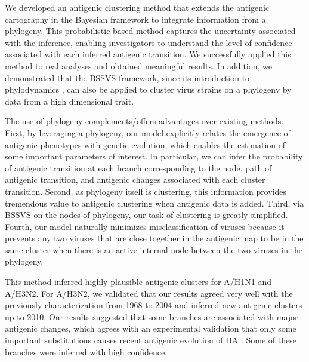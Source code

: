 \documentclass[11pt,oneside,letterpaper]{article}
\begin{document}
We developed an antigenic clustering method that extends the antigenic cartography in the Bayesian framework to integrate information from a phylogeny. 
This probabilistic-based method captures the uncertainty associated with the inference, enabling investigators to understand the level of confidence associated with each inferred antigenic transition. 
We successfully applied this method to real analyses and obtained meaningful results.
In addition, we demonstrated that the BSSVS framework, since its introduction to phylodynamics \cite{lemey_bayesian_2009, drummond_bayesian_2010}, can also be applied to cluster virus strains on a phylogeny by data from a high dimensional trait.  %

The use of phylogeny complements/offers advantages over existing methods. 
First, by leveraging a phylogeny, our model explicitly relates the emergence of antigenic phenotypes with genetic evolution, which enables the estimation of some important parameters of interest. 
In particular, we can infer the probability of antigenic transition at each branch corresponding to the node, path of antigenic transition, and antigenic changes associated with each cluster transition. 
Second, as phylogeny itself is clustering, this information provides tremendous value to antigenic clustering when antigenic data is added. 
Third, via BSSVS on the nodes of phylogeny, our task of clustering is greatly simplified. 
Fourth, our model naturally minimizes misclassification of viruses because it prevents any two viruses that are close together in the antigenic map to be in the same cluster when there is an active internal node between the two viruses in the phylogeny.

This method inferred highly plausible antigenic clusters for A/H1N1 and A/H3N2. 
For  A/H3N2, we validated that our results agreed very well with the previously characterization from 1968 to 2004 \cite{smith_mapping_2004} and inferred new antigenic clusters up to 2010. 
Our results suggested that some branches are associated with major antigenic changes, which agrees with an experimental validation that only some important substitutions causes recent antigenic evolution of HA \cite{koel_substitutions_2013}. 
Some of these branches were inferred with high confidence. 
\end{document}
